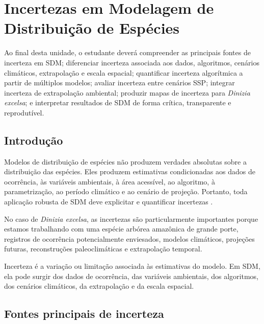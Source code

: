\chapter[Incertezas em SDM]{Incertezas em Modelagem de Distribuição de Espécies}

\begin{objetivos}
	Ao final desta unidade, o estudante deverá compreender as principais fontes de incerteza em SDM; diferenciar incerteza associada aos dados, algoritmos, cenários climáticos, extrapolação e escala espacial; quantificar incerteza algorítmica a partir de múltiplos modelos; avaliar incerteza entre cenários SSP; integrar incerteza de extrapolação ambiental; produzir mapas de incerteza para \textit{Dinizia excelsa}; e interpretar resultados de SDM de forma crítica, transparente e reprodutível.
\end{objetivos}

\section{Introdução}

Modelos de distribuição de espécies não produzem verdades absolutas sobre a distribuição das espécies. Eles produzem estimativas condicionadas aos dados de ocorrência, às variáveis ambientais, à área acessível, ao algoritmo, à parametrização, ao período climático e ao cenário de projeção. Portanto, toda aplicação robusta de SDM deve explicitar e quantificar incertezas \parencite{guisan2017habitat,franklin2023,zurell2020benchmarking,yates2018transferability}.

No caso de \textit{Dinizia excelsa}, as incertezas são particularmente importantes porque estamos trabalhando com uma espécie arbórea amazônica de grande porte, registros de ocorrência potencialmente enviesados, modelos climáticos, projeções futuras, reconstruções paleoclimáticas e extrapolação temporal.

\begin{conceito}[title={\faBook\quad Incerteza em SDM}]
	Incerteza é a variação ou limitação associada às estimativas do modelo. Em SDM, ela pode surgir dos dados de ocorrência, das variáveis ambientais, dos algoritmos, dos cenários climáticos, da extrapolação e da escala espacial.
\end{conceito}

\section{Fontes principais de incerteza}

